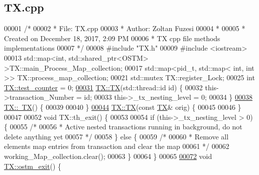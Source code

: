 \hypertarget{_t_x_8cpp_source}{}\subsection{T\+X.\+cpp}

\begin{DoxyCode}
00001 \textcolor{comment}{/* }
00002 \textcolor{comment}{ * File:   TX.cpp}
00003 \textcolor{comment}{ * Author: Zoltan Fuzesi}
00004 \textcolor{comment}{ * }
00005 \textcolor{comment}{ * Created on December 18, 2017, 2:09 PM}
00006 \textcolor{comment}{ * TX cpp file methods implementations}
00007 \textcolor{comment}{ */}
00008 \textcolor{preprocessor}{#include "TX.h"}
00009 \textcolor{preprocessor}{#include <iostream>}
00013 std::map<int, std::shared\_ptr<OSTM> >TX::main\_Process\_Map\_collection;
00017 std::map<pid\_t, std::map< int, int >> TX::process\_map\_collection;
00021 std::mutex TX::register\_Lock;
00025 \textcolor{keywordtype}{int} \hyperlink{class_t_x_a25838234aab99ae891a90eb8623a8b3c}{TX::test\_counter} = 0;
\hypertarget{_t_x_8cpp_source.tex_l00031}{}\hyperlink{class_t_x_a8a4b83eab0171ae834bfa92bbced1094}{00031} \hyperlink{class_t_x_a8a4b83eab0171ae834bfa92bbced1094}{TX::TX}(std::thread::id \textcolor{keywordtype}{id}) \{
00032     this->transaction\_Number = id;
00033     this->\_tx\_nesting\_level = 0;
00034 \}
\hypertarget{_t_x_8cpp_source.tex_l00038}{}\hyperlink{class_t_x_abecf854cc3228ab6dd51175b3cd1c70a}{00038} \hyperlink{class_t_x_abecf854cc3228ab6dd51175b3cd1c70a}{TX::~TX}() \{
00039    
00040 \}
\hypertarget{_t_x_8cpp_source.tex_l00044}{}\hyperlink{class_t_x_ab96b3dd2bfd621b47307f0af3ec4f35c}{00044} \hyperlink{class_t_x_a8a4b83eab0171ae834bfa92bbced1094}{TX::TX}(\textcolor{keyword}{const} \hyperlink{class_t_x}{TX}& orig) \{
00045 
00046 \}
00047 
00052 \textcolor{keywordtype}{void} TX::th\_exit() \{
00053 
00054     \textcolor{keywordflow}{if} (this->\_tx\_nesting\_level > 0) \{
00055         \textcolor{comment}{/*}
00056 \textcolor{comment}{         * Active nested transactions running in background, do not delete anything yet}
00057 \textcolor{comment}{         */}
00058     \} \textcolor{keywordflow}{else} \{
00059         \textcolor{comment}{/* }
00060 \textcolor{comment}{         * Remove all elements map entries from transaction and clear the map}
00061 \textcolor{comment}{         */}
00062         working\_Map\_collection.clear();
00063     \}
00064 \}
00065 
\hypertarget{_t_x_8cpp_source.tex_l00072}{}\hyperlink{class_t_x_aa9739c5c2077454c779098db7baefc2b}{00072} \textcolor{keywordtype}{void} \hyperlink{class_t_x_aa9739c5c2077454c779098db7baefc2b}{TX::ostm\_exit}() \{

\end{DoxyCode}
